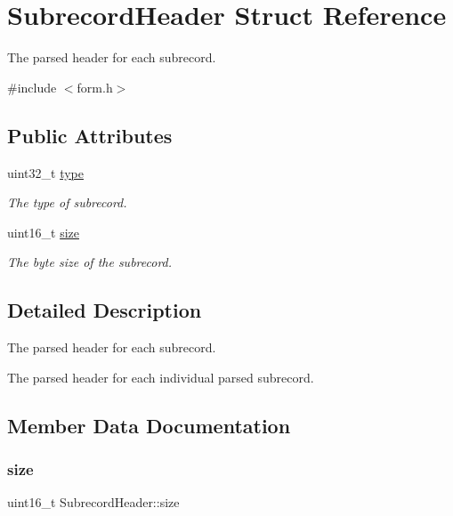 \hypertarget{struct_subrecord_header}{}\section{Subrecord\+Header Struct Reference}
\label{struct_subrecord_header}


The parsed header for each subrecord.  




{\ttfamily \#include $<$form.\+h$>$}

\subsection*{Public Attributes}
\begin{DoxyCompactItemize}
\item 
uint32\+\_\+t \hyperlink{struct_subrecord_header_a549017a7821553ae4e4ceb72322b0464}{type}
\begin{DoxyCompactList}\small\item\em The type of subrecord. \end{DoxyCompactList}\item 
uint16\+\_\+t \hyperlink{struct_subrecord_header_abd784735b592b962c189bbd59fe42271}{size}
\begin{DoxyCompactList}\small\item\em The byte size of the subrecord. \end{DoxyCompactList}\end{DoxyCompactItemize}


\subsection{Detailed Description}
The parsed header for each subrecord. 

The parsed header for each individual parsed subrecord. 

\subsection{Member Data Documentation}
\mbox{\label{struct_subrecord_header_abd784735b592b962c189bbd59fe42271}} 
\subsubsection{\texorpdfstring{size}{size}}
{\footnotesize\ttfamily uint16\+\_\+t Subrecord\+Header\+::size}



